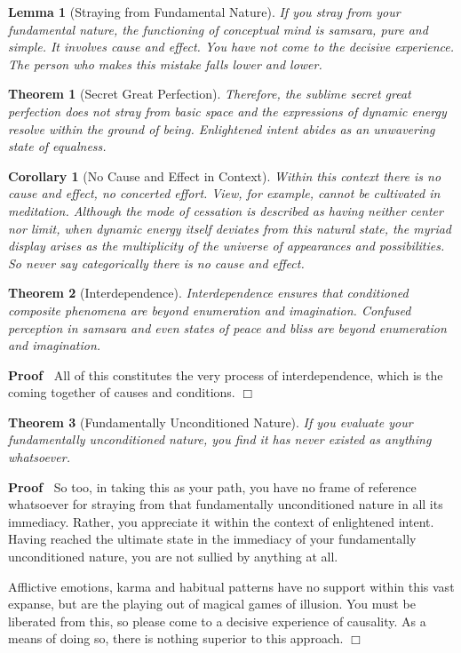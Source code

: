 \documentclass{article}
\newenvironment{proof}{\noindent\textbf{Proof\ }}{\hspace*{\fill}$\Box$\medskip}
\newtheorem{corollary}{Corollary}
\newtheorem{lemma}{Lemma}
\newtheorem{theorem}{Theorem}
\begin{document}
\begin{lemma}
  [Straying from Fundamental Nature] If you stray from your fundamental
  nature, the functioning of conceptual mind is samsara, pure and simple. It
  involves cause and effect. You have not come to the decisive experience. The
  person who makes this mistake falls lower and lower.
\end{lemma}

\begin{theorem}
  [Secret Great Perfection] Therefore, the sublime secret great perfection
  does not stray from basic space and the expressions of dynamic energy
  resolve within the ground of being. Enlightened intent abides as an
  unwavering state of equalness.
\end{theorem}

\begin{corollary}
  [No Cause and Effect in Context] Within this context there is no cause and
  effect, no concerted effort. View, for example, cannot be cultivated in
  meditation. Although the mode of cessation is described as having neither
  center nor limit, when dynamic energy itself deviates from this natural
  state, the myriad display arises as the multiplicity of the universe of
  appearances and possibilities. So never say categorically there is no cause
  and effect.
\end{corollary}

\begin{theorem}
  [Interdependence] Interdependence ensures that conditioned composite
  phenomena are beyond enumeration and imagination. Confused perception in
  samsara and even states of peace and bliss are beyond enumeration and
  imagination.
\end{theorem}

\begin{proof}
  All of this constitutes the very process of interdependence, which is the
  coming together of causes and conditions.
\end{proof}

\begin{theorem}
  [Fundamentally Unconditioned Nature] If you evaluate your fundamentally
  unconditioned nature, you find it has never existed as anything whatsoever.
\end{theorem}

\begin{proof}
  So too, in taking this as your path, you have no frame of reference
  whatsoever for straying from that fundamentally unconditioned nature in all
  its immediacy. Rather, you appreciate it within the context of enlightened
  intent. Having reached the ultimate state in the immediacy of your
  fundamentally unconditioned nature, you are not sullied by anything at all.
  
  Afflictive emotions, karma and habitual patterns have no support within this
  vast expanse, but are the playing out of magical games of illusion. You must
  be liberated from this, so please come to a decisive experience of
  causality. As a means of doing so, there is nothing superior to this
  approach.
\end{proof}
\end{document}
